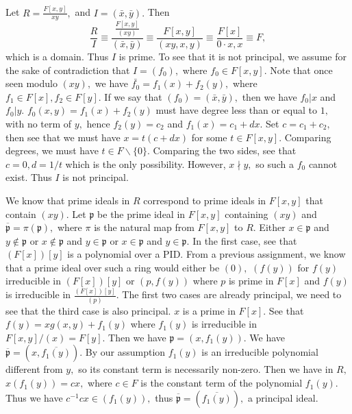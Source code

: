 \documentclass{article}
\begin{document}
\section{} %
Let $R=\frac{F[x,y]}{xy},$ and $I=(\bar{x},\bar{y}).$ Then $$\frac{R}{I} \equiv \frac{\frac{F[x,y]}{(xy)}}{(\bar{x},\bar{y})} \equiv \frac{F[x,y]}{(xy,x,y)} 
\equiv \frac{F[x]}{0 \cdot x,x} \equiv F,$$ which is a domain. Thus $I$ is prime. To see that it is not principal, we assume for the sake of contradiction 
that $I=(f_0),$ where $f_0 \in F[x,y].$ Note that once seen modulo $(xy),$ we have $\bar{f_0}=f_1(x)+f_2(y),$ where $f_1 \in F[x], f_2 \in F[y].$ If we say 
that $(f_0)=(\bar{x},\bar{y}),$ then we have $f_0 | x$ and $f_0 | y.$ $f_0(x,y)=f_1(x)+f_2(y)$ must have degree less than  or equal to $1,$ with no term of 
$y,$ hence $f_2(y)=c_2$ and $f_1(x)=c_1+dx.$ Set $c=c_1+c_2,$ then see that we must have $x=t(c+dx)$ for some $t \in F[x,y].$ Comparing degrees, we must 
have $t \in F \backslash \{0\}.$ Comparing the two sides, see that $c=0, d=1/t$ which is the only possibility. However, $x \nmid y,$ so such a $f_0$ cannot 
exist. Thus $I$ is not principal.

We know that prime ideals in $R$ correspond to prime ideals in $F[x,y]$ that contain $(xy).$ Let $\mathfrak{p}$ be the prime ideal in $F[x,y]$ containing 
$(xy)$ and $\overline{\mathfrak{p}}=\pi(\mathfrak{p}),$ where $\pi$ is the natural map from $F[x,y]$ to $R.$ Either $x \in \mathfrak{p}$ and $y \notin 
\mathfrak{p}$ or $x \notin \mathfrak{p}$ and $y \in \mathfrak{p}$ or $x \in \mathfrak{p}$ and $y \in \mathfrak{p}.$ In the first case, see that $(F[x])[y]$ 
is a polynomial over a PID. From a previous assignment, we know that a prime ideal over such a ring would either be $(0),$ $(f(y))$ for $f(y)$ irreducible 
in $(F[x])[y]$ or $(p,f(y))$ where $p$ is prime in $F[x]$ and $f(y)$ is irreducible in $\frac{(F[x])[y]}{(p)}$. The first two cases are already principal, 
we need to see that the third case is also principal. $x$ is a prime in $F[x].$ See that $f(y)=xg(x,y)+ f_1(y)$ where $f_1(y)$ is irreducible in 
$F[x,y]/(x)=F[y].$ Then we have $\mathfrak{p}=(x,f_1(y)).$ We have $\overline{\mathfrak{p}}=(x,\overline{f_1(y)}).$ By our assumption $f_1(y)$ is an 
irreducible polynomial different from $y,$ so its constant term is necessarily non-zero. Then we have in $R,$ $x(f_1(y))=cx,$ where $ c \in F$ is the 
constant term of the polynomial $f_1(y).$ Thus we have $c^{-1}cx \in (f_1(y)),$ thus $\overline{\mathfrak{p}}=(\overline{f_1(y)}),$ a principal ideal. 
\end{document}
